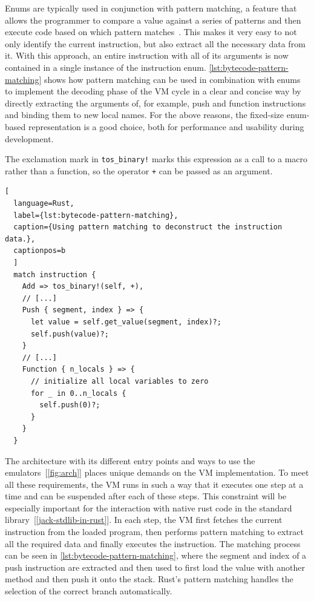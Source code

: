 Enums are typically used in conjunction with pattern matching, a feature that allows the programmer to compare a value against a series of patterns and then execute code based on which pattern matches~\cite[Chapter~6.2]{klabnik2019rust}.
This makes it very easy to not only identify the current instruction, but also extract all the necessary data from it.
With this approach, an entire instruction with all of its arguments is now contained in a single instance of the instruction enum.
\cref{lst:bytecode-pattern-matching} shows how pattern matching can be used in combination with enums to implement the decoding phase of the VM cycle in a clear and concise way by directly extracting the arguments of, for example, push and function instructions and binding them to new local names.
For the above reasons, the fixed-size enum-based representation is a good choice, both for performance and usability during development.

The exclamation mark in \verb+tos_binary!+ marks this expression as a call to a macro rather than a function, so the operator \verb*=+= can be passed as an argument.
\begin{lstlisting}[
  language=Rust,
  label={lst:bytecode-pattern-matching},
  caption={Using pattern matching to deconstruct the instruction data.},
  captionpos=b
  ]
  match instruction {
    Add => tos_binary!(self, +),
    // [...]
    Push { segment, index } => {
      let value = self.get_value(segment, index)?;
      self.push(value)?;
    }
    // [...]
    Function { n_locals } => {
      // initialize all local variables to zero
      for _ in 0..n_locals {
        self.push(0)?;
      }
    }
  }
\end{lstlisting}

\label{step-by-step}
The architecture with its different entry points and ways to use the emulators~[\ref{fig:arch}] places unique demands on the VM implementation.
To meet all these requirements, the VM runs in such a way that it executes one step at a time and can be suspended after each of these steps.
This constraint will be especially important for the interaction with native rust code in the standard library~[\ref{jack-stdlib-in-rust}].
In each step, the VM first fetches the current instruction from the loaded program, then performs pattern matching to extract all the required data and finally executes the instruction.
The matching process can be seen in \cref{lst:bytecode-pattern-matching}, where the segment and index of a push instruction are extracted and then used to first load the value with another method and then push it onto the stack.
Rust's pattern matching handles the selection of the correct branch automatically.

